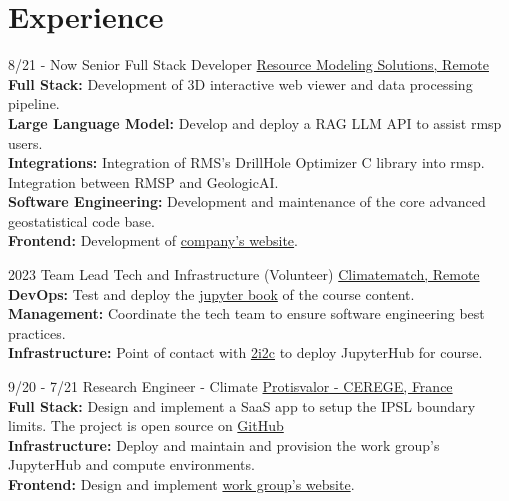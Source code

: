 \documentclass[]{friggeri-cv}
\begin{document}
\section{Experience}
\begin{entrylist}
	
	\entry
	{8/21 - Now}
	{Senior Full Stack Developer}
	{\href{https://resourcemodelingsolutions.com/}{Resource Modeling Solutions, Remote}}
	{
	\\[-0.5em]
	\textbf{Full Stack: }Development of 3D interactive web viewer and data processing pipeline.
	\\[3pt]
	\textbf{Large Language Model: }Develop and deploy a RAG LLM API to assist rmsp users. 
	\\[3pt]
	\textbf{Integrations: }Integration of RMS's DrillHole Optimizer C library into rmsp. Integration between RMSP and GeologicAI.
	\\[3pt]
	\textbf{Software Engineering: }Development and maintenance of the core advanced geostatistical code base.
	\\[3pt]
	\textbf{Frontend: }Development of \href{https://resourcemodelingsolutions.com}{company's website}.
	}

	\entry
	{2023}
	{Team Lead Tech and Infrastructure (Volunteer)}
	{\href{https://sites.google.com/climatematch.io/academy/about}{Climatematch, Remote}}
	{
		\\[-0.5em]
		\textbf{DevOps: }Test and deploy the \href{https://comptools.climatematch.io/tutorials/intro.html}{jupyter book} of the course content. 
		\\[3pt]
		\textbf{Management: }Coordinate the tech team to ensure software engineering best practices.
		\\[3pt]
		\textbf{Infrastructure: }Point of contact with \href{https://2i2c.org}{2i2c} to deploy JupyterHub for course.
	}
  
	\entry
	{9/20 - 7/21}
	{Research Engineer - Climate}
	{\href{https://paleoclim-cnrs.github.io/}{Protisvalor - CEREGE, France}}
	{
	\\[-0.5em]
	\textbf{Full Stack: } Design and implement a SaaS app to setup the IPSL boundary limits. The project is open source on \href{https://cerege-cl.github.io/netcdf_editor_app/}{GitHub}
	\\[3pt]
	\textbf{Infrastructure: } Deploy and maintain and provision the work group's JupyterHub and compute environments.
	\\[3pt]
	\textbf{Frontend: } Design and implement \href{https://paleoclim-cnrs.github.io}{work group's website}.
	}
	

\end{entrylist}
\end{document}
